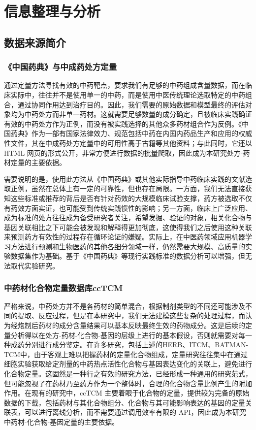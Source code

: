 
\chapter{信息整理与分析}

\section{数据来源简介}

\subsection{《中国药典》与中成药处方定量}

通过定量方法寻找有效的中药靶点，要求我们有足够的中药组成含量数据，而在临床实际中，往往并不是使用单一的中药，而是使用中医传统理论选取特定的中药组合，通过协同作用达到治疗目的。因此，我们需要的原始数据和模型最终的评估对象均为中药处方而非单一药材。这就需要足够数量的成分确定，且被临床实践确证有效的中药处方作为正例，而没有被实践选择的其他众多药材组合作为反例。《中国药典》作为一部有国家法律效力、规范包括中药在内国内药品生产和应用的权威性文件，其在中成药处方定量中的可用性高于古籍等其他资料；与此同时，它还以 HTML 网页的形式公开，非常方便进行数据的批量爬取，因此成为本研究处方-药材定量的主要依据\cite{2020-ie}。

需要说明的是，使用此方法从《中国药典》或其他实际指导中药临床实践的文献选取正例，虽然在总体上有一定的可靠性，但也存在局限。一方面，我们无法直接获知这些标准或推荐的背后是否有针对药效的大规模临床试验支撑，药方被选取不仅有药效方面实证，也可能受到传统实践惯性的影响；另一方面，临床上广泛应用、成为标准的处方往往成为备受研究者关注，希望发掘、验证的对象，相关化合物与基因关联相比之下可能会被发现和解释得更加彻底，这使得我们之后使用这种关联来预测药方有效性的过程存在循环论证的嫌疑。实际上，在中医药领域应用机器学习方法进行预测和生物医药的其他各细分领域一样，仍然需要大规模、高质量的实验数据集作为基础。基于《中国药典》等现行实践标准的数据分析可以增强，但无法取代实验研究。

\subsection{中药材化合物定量数据库ccTCM}

严格来说，中药处方并不是各药材的简单混合，根据制剂类型的不同还可能涉及不同的提取、反应过程，但是在本研究中，我们无法建模这些复杂的处理过程，而认为经炮制后药材的成分含量结果可以基本反映最终生效的药物成分。这是后续的定量分析得以在处方-药材-化合物-基因的层级上进行的基本假设，否则就需要对每一种成药分别进行成分鉴定。在许多研究，包括上述的HERB、ITCM、BATMAN-TCM中，由于客观上难以把握药材的定量化合物组成，定量研究往往集中在通过细胞实验获取给定剂量的中药热点活性化合物与基因表达变化的关联上，避免进行化合物定量。这固然是一种行之有效的研究方法，已经形成一种通用的研究范式，但可能忽视了在药材乃至药方作为一个整体时，合理的化合物含量比例产生的附加作用。在现有的研究中，ccTCM 主要着眼于化合物的定量，提供较为完备的原始数据的下载，包括药材与其化合物组分、化合物与其可能影响表达的基因的定量关联表，可以进行离线分析，而不需要通过调用效率有限的 API，因此成为本研究中药材-化合物-基因定量的主要依据\cite{Yang_Zhu_Yao_Chen_Chen_Gu_Jiang_Chen_Zhang_Wu_et_al._2023}。

